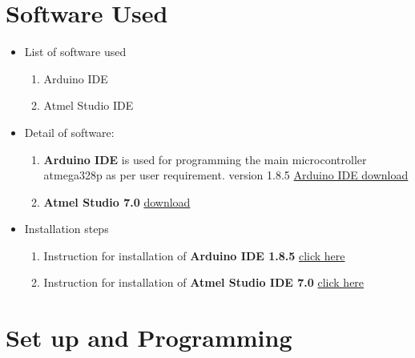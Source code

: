 \documentclass[a4paper,12pt,oneside]{book}
\begin{document}
\section{Software Used}
\begin{itemize}
  \item List of software used
  \begin{enumerate}
  \item Arduino IDE
  \item Atmel Studio IDE
  \end{enumerate}
  \item Detail of software:
  \begin{enumerate}
  \item \textbf{Arduino IDE} is used for programming the main microcontroller atmega328p as per user requirement. version 1.8.5
  \href{https://www.arduino.cc/en/Main/Software?}{Arduino IDE download}
  \item \textbf{Atmel Studio 7.0}
  \href{http://studio.download.atmel.com/7.0.1931/as-installer-7.0.1931-full.exe}{download}
  \end{enumerate}
  \clearpage
  \item Installation steps
  \begin{enumerate}
  \item Instruction for installation of \textbf{Arduino IDE 1.8.5}
  \href{https://learn.sparkfun.com/tutorials/installing-arduino-ide}{click here}
  \item Instruction for installation of \textbf{Atmel Studio IDE 7.0} \href{http://ww1.microchip.com/downloads/en/DeviceDoc/Getting-Started-with-Atmel-Studio7.pdf}{click here}
  \end{enumerate} 
\end{itemize}
\section{Set up and Programming}
\end{document}
